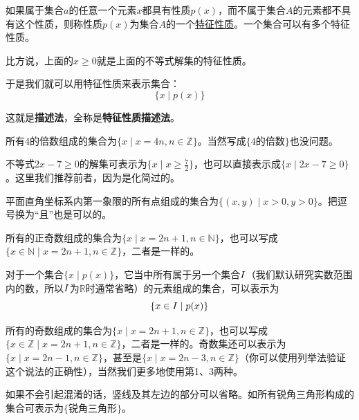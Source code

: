 \documentclass[lang=cn,math=cm,chinesefont=nofont,11pt,scheme=chinese,onecol]{elegantbook}
\begin{document}
\begin{definition}[特征性质]
如果属于集合$a$的任意一个元素$x$都具有性质$p(x)$，而不属于集合$A$的元素都不具有这个性质，则称性质$p(x)$为集合$A$的一个\underline{特征性质}。一个集合可以有多个特征性质。
\end{definition}
比方说，上面的$x\geq 0$就是上面的不等式解集的特征性质。

于是我们就可以用特征性质来表示集合：$$\{x\mid p(x)\}$$

这就是\textbf{描述法}，全称是\textbf{特征性质描述法}。

\begin{example}
  所有4的倍数组成的集合为$\{x\mid x=4n,n\in\mathbb{Z}\}$。当然写成$\{\text{4的倍数}\}$也没问题。
\end{example}

\begin{example}
  不等式$2x-7\geq 0$的解集可表示为$\{x\mid x\geq\frac{7}{2}\}$，也可以直接表示成$\{x\mid 2x-7\geq 0\}$。这里我们推荐前者，因为是化简过的。
\end{example}

\begin{example}
  平面直角坐标系内第一象限的所有点组成的集合为$\{(x,y)\mid x>0,y>0\}$。把逗号换为“且”也是可以的。
\end{example}

\begin{example}
  所有的正奇数组成的集合为$\{x\mid x=2n+1,n\in\mathbb{N}\}$，也可以写成$\{x\in\mathbb{N}\mid x=2n+1,n\in\mathbb{Z}\}$，二者是一样的。
\end{example}

\begin{remark}
  对于一个集合$\{x\mid p(x)\}$，它当中所有属于另一个集合$\boldmath{I}$（我们默认研究实数范围内的数，所以$\boldmath{I}$为$\mathbb{R}$时通常省略）的元素组成的集合，可以表示为$$\{x\in\boldmath{I}\mid p(x)\}$$
\end{remark}

\begin{example}
  \label{exp:1}
  所有的奇数组成的集合为$\{x\mid x=2n+1,n\in\mathbb{Z}\}$，也可以写成$\{x\in\mathbb{Z}\mid x=2n+1,n\in\mathbb{Z}\}$，二者是一样的。奇数集还可以表示为$\{x\mid x=2n-1,n\in\mathbb{Z}\}$，甚至是$\{x\mid x=2n-3,n\in\mathbb{Z}\}$（你可以使用列举法验证这个说法的正确性），当然我们更多地使用第1、3两种。
\end{example}

如果不会引起混淆的话，竖线及其左边的部分可以省略。如所有锐角三角形构成的集合可表示为$\{\text{锐角三角形}\}$。
\end{document}
